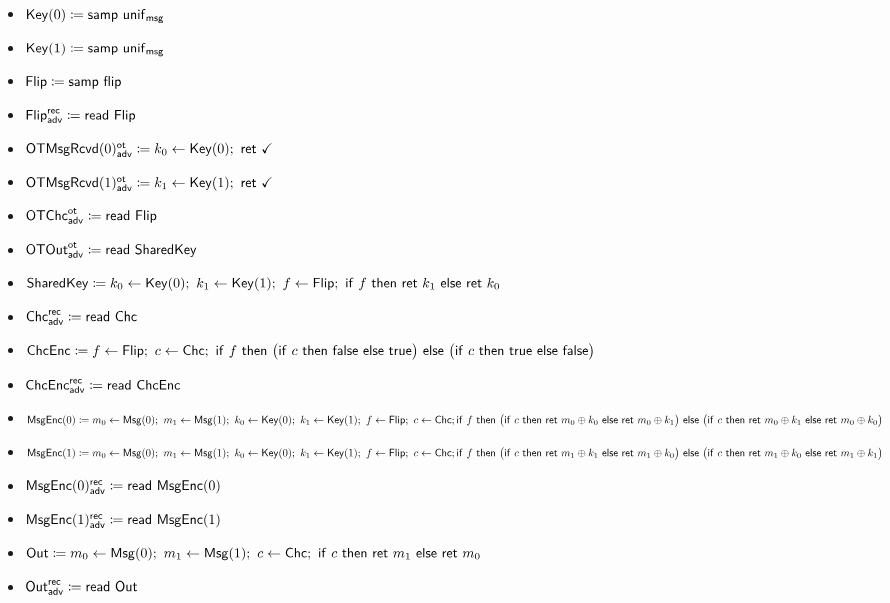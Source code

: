 \begin{itemize}
\item $\mathsf{Key}(0) \coloneqq \mathsf{samp} \ \mathsf{unif}_{\mathsf{msg}}$
\item $\mathsf{Key}(1) \coloneqq \mathsf{samp} \ \mathsf{unif}_{\mathsf{msg}}$
\item $\mathsf{Flip} \coloneqq \mathsf{samp} \ \mathsf{flip}$
\item {\color{blue} $\mathsf{Flip}^{\mathsf{rec}}_{\mathsf{adv}} \coloneqq \mathsf{read} \ \mathsf{Flip}$}
\item {\color{blue} $\LeakOTMsgRcvd(0)^\ot_\adv \coloneqq k_0 \leftarrow \Key(0); \ \ret{\checkmark}$}
\item {\color{blue} $\LeakOTMsgRcvd(1)^\ot_\adv \coloneqq k_1 \leftarrow \Key(1); \ \ret{\checkmark}$}
\item {\color{blue} $\mathsf{OTChc}^{\mathsf{ot}}_{\mathsf{adv}} \coloneqq \mathsf{read} \ \mathsf{Flip}$}
\item {\color{blue} $\mathsf{OTOut}^{\mathsf{ot}}_{\mathsf{adv}} \coloneqq \mathsf{read} \ \mathsf{SharedKey}$}
\item $\SharedKey \coloneqq k_0 \leftarrow \Key(0); \ k_1 \leftarrow \Key(1); \ f \leftarrow \Flip; \ \ifte{f}{\ret{k_1}}{\ret{k_0}}$
\item {\color{blue} $\mathsf{Chc}^{\mathsf{rec}}_{\mathsf{adv}} \coloneqq \mathsf{read} \ \mathsf{Chc}$}
\item $\ChcEnc \coloneqq f \leftarrow \Flip; \ c \leftarrow \Chc; \ \ifte{f}{\big(\ifte{c}{\false}{\true}\big)}{\big(\ifte{c}{\true}{\false}\big)}$
\item {\color{blue} $\mathsf{ChcEnc}^{\mathsf{rec}}_{\mathsf{adv}} \coloneqq \mathsf{read} \ \mathsf{ChcEnc}$}
\item $\mathsf{MsgEnc}(0) \coloneqq m_0 \leftarrow \mathsf{Msg}(0); \ m_1 \leftarrow \mathsf{Msg}(1); \ k_0 \leftarrow \mathsf{Key}(0); \ k_1 \leftarrow \mathsf{Key}(1); \ f \leftarrow \mathsf{Flip}; \ c \leftarrow \mathsf{Chc}; \\ \mathsf{if} \ f \ \mathsf{then} \ \big(\mathsf{if} \ c \ \mathsf{then} \ \mathsf{ret} \ m_0 \oplus k_0 \ \mathsf{else} \ \mathsf{ret} \ m_0 \oplus k_1\big) \ \mathsf{else} \ \big(\mathsf{if} \ c \ \mathsf{then} \ \mathsf{ret} \ m_0 \oplus k_1 \ \mathsf{else} \ \mathsf{ret} \ m_0 \oplus k_0\big)$
\item $\mathsf{MsgEnc}(1) \coloneqq m_0 \leftarrow \mathsf{Msg}(0); \ m_1 \leftarrow \mathsf{Msg}(1); \ k_0 \leftarrow \mathsf{Key}(0); \ k_1 \leftarrow \mathsf{Key}(1); \ f \leftarrow \mathsf{Flip}; \ c \leftarrow \mathsf{Chc}; \\ \mathsf{if} \ f \ \mathsf{then} \ \big(\mathsf{if} \ c \ \mathsf{then} \ \mathsf{ret} \ m_1 \oplus k_1 \ \mathsf{else} \ \mathsf{ret} \ m_1 \oplus k_0\big) \ \mathsf{else} \ \big(\mathsf{if} \ c \ \mathsf{then} \ \mathsf{ret} \ m_1 \oplus k_0 \ \mathsf{else} \ \mathsf{ret} \ m_1 \oplus k_1\big)$
\item {\color{blue} $\mathsf{MsgEnc}(0)^{\mathsf{rec}}_{\mathsf{adv}} \coloneqq \mathsf{read} \ \mathsf{MsgEnc}(0)$}
\item {\color{blue} $\mathsf{MsgEnc}(1)^{\mathsf{rec}}_{\mathsf{adv}} \coloneqq \mathsf{read} \ \mathsf{MsgEnc}(1)$}
\item $\Out \coloneqq m_0 \leftarrow \Msg(0); \ m_1 \leftarrow \Msg(1); \ c \leftarrow \Chc; \ \ifte{c}{\ret{m_1}}{\ret{m_0}}$
\item {\color{blue} $\mathsf{Out}^{\mathsf{rec}}_{\mathsf{adv}} \coloneqq \mathsf{read} \ \mathsf{Out}$}
\end{itemize}


